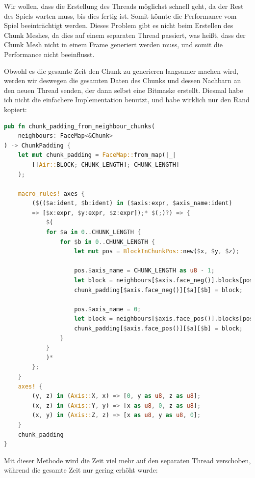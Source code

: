 Wir wollen, dass die Erstellung des Threads möglichst
schnell geht, da der Rest des Spiels warten muss,
bis dies fertig ist. Somit könnte die Performance
vom Spiel beeinträchtigt werden. Dieses Problem gibt
es nicht beim Erstellen des Chunk Meshes, da dies auf
einem separaten Thread passiert, was heißt, dass der
Chunk Mesh nicht in einem Frame generiert werden muss,
und somit die Performance nicht beeinflusst.

Obwohl es die gesamte Zeit den Chunk zu generieren
langsamer machen wird, werden wir deswegen die gesamten
Daten des Chunks und dessen Nachbarn an den neuen
Thread senden, der dann selbst eine Bitmaske erstellt.
Diesmal habe ich nicht die einfachere Implementation
benutzt, und habe wirklich nur den Rand kopiert:

\begin{lstlisting}[language=Rust]
pub fn chunk_padding_from_neighbour_chunks(
	neighbours: FaceMap<&Chunk>
) -> ChunkPadding {
	let mut chunk_padding = FaceMap::from_map(|_|
		[[Air::BLOCK; CHUNK_LENGTH]; CHUNK_LENGTH]
	);

	macro_rules! axes {
		($(($a:ident, $b:ident) in ($axis:expr, $axis_name:ident)
		=> [$x:expr, $y:expr, $z:expr]);* $(;)?) => {
			$(
			for $a in 0..CHUNK_LENGTH {
				for $b in 0..CHUNK_LENGTH {
					let mut pos = BlockInChunkPos::new($x, $y, $z);

					pos.$axis_name = CHUNK_LENGTH as u8 - 1;
					let block = neighbours[$axis.face_neg()].blocks[pos];
					chunk_padding[$axis.face_neg()][$a][$b] = block;

					pos.$axis_name = 0;
					let block = neighbours[$axis.face_pos()].blocks[pos];
					chunk_padding[$axis.face_pos()][$a][$b] = block;
				}
			}
			)*
		};
	}
	axes! {
		(y, z) in (Axis::X, x) => [0, y as u8, z as u8];
		(x, z) in (Axis::Y, y) => [x as u8, 0, z as u8];
		(x, y) in (Axis::Z, z) => [x as u8, y as u8, 0];
	}
	chunk_padding
}
\end{lstlisting}

Mit dieser Methode wird die Zeit viel mehr auf den
separaten Thread verschoben, während die gesamte
Zeit nur gering erhöht wurde:

\vspace{0.3cm}



